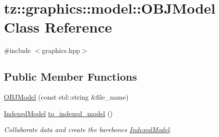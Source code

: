 \hypertarget{classtz_1_1graphics_1_1model_1_1_o_b_j_model}{}\section{tz\+:\+:graphics\+:\+:model\+:\+:O\+B\+J\+Model Class Reference}
\label{classtz_1_1graphics_1_1model_1_1_o_b_j_model}


{\ttfamily \#include $<$graphics.\+hpp$>$}

\subsection*{Public Member Functions}
\begin{DoxyCompactItemize}
\item 
\mbox{\hyperlink{classtz_1_1graphics_1_1model_1_1_o_b_j_model_a12782990aef3edbf3989dd5115a27c2d}{O\+B\+J\+Model}} (const std\+::string \&file\+\_\+name)
\item 
\mbox{\label{classtz_1_1graphics_1_1model_1_1_o_b_j_model_ad0dcb65ddcdf1bb21e74b97235bfa215}} 
\mbox{\hyperlink{classtz_1_1graphics_1_1model_1_1_indexed_model}{Indexed\+Model}} \mbox{\hyperlink{classtz_1_1graphics_1_1model_1_1_o_b_j_model_ad0dcb65ddcdf1bb21e74b97235bfa215}{to\+\_\+indexed\+\_\+model}} ()
\begin{DoxyCompactList}\small\item\em Collaborate data and create the barebones \mbox{\hyperlink{classtz_1_1graphics_1_1model_1_1_indexed_model}{Indexed\+Model}}. \end{DoxyCompactList}\end{DoxyCompactItemize}
